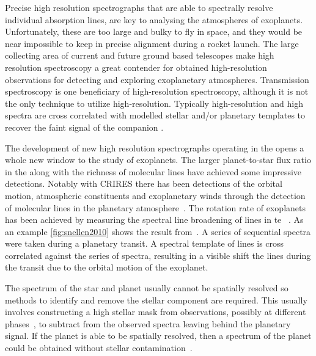 Precise high resolution spectrographs that are able to spectrally resolve individual absorption lines, are key to analysing the atmospheres of exoplanets.
Unfortunately, these are too large and bulky to fly in space, and they would be near impossible to keep in precise alignment during a rocket launch.
The large collecting area of current and future ground based telescopes make high resolution spectroscopy a great contender for obtained high-resolution observations for detecting and exploring exoplanetary atmospheres.
Transmission spectroscopy is one beneficiary of high-resolution spectroscopy, although it is not the only technique to utilize high-resolution.
Typically high-resolution and high \snr{} spectra are cross correlated with modelled stellar and/or planetary templates to recover the faint signal of the companion \citep[e.g.][]{piskorz_evidence_2016}.

The development of new high resolution spectrographs operating in the \nir{} opens a whole new window to the study of exoplanets.
The larger planet-to-star flux ratio in the \nir{} along with the richness of molecular lines have achieved some impressive detections.
Notably with CRIRES there has been detections of the orbital motion, atmospheric constituents and exoplanetary winds through the detection of \nir{} molecular lines in the planetary atmosphere~\citep[e.g.][]{snellen_orbital_2010, dekok_detection_2013, brogi_carbon_2014, brogi_rotation_2016, schwarz_evidence_2015}.
The rotation rate of exoplanets has been achieved by measuring the spectral line broadening of lines in te \nir{}~\citep{snellen_fast_2014, brogi_rotation_2016}.
As an example \cref{fig:snellen2010} shows the result from~\citet{snellen_orbital_2010}.
A series of sequential \nir{} spectra were taken during a planetary transit.
A spectral template of  lines is cross correlated against the series of spectra, resulting in a visible shift the  lines during the transit due to the orbital motion of the exoplanet.

The spectrum of the star and planet usually cannot be spatially resolved so methods to identify and remove the stellar component are required.
This usually involves constructing a high \snr{} stellar mask from observations, possibly at different phases~\citep[e.g.][]{rodler_weighing_2012}, to subtract from the observed spectra leaving behind the planetary signal.
If the planet is able to be spatially resolved, then a spectrum of the planet could be obtained without stellar contamination~\citep[e.g.][]{snellen_combining_2015}.

